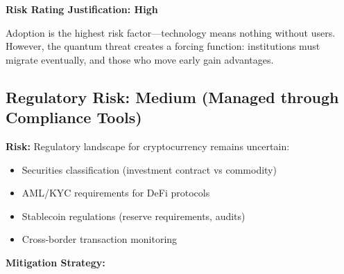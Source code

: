 \documentclass[11pt,a4paper]{article}
\begin{document}
\textbf{Risk Rating Justification: High}

Adoption is the highest risk factor—technology means nothing without users. However, the quantum threat creates a forcing function: institutions must migrate eventually, and those who move early gain advantages.

\subsection{Regulatory Risk: Medium (Managed through Compliance Tools)}

\textbf{Risk:} Regulatory landscape for cryptocurrency remains uncertain:
\begin{itemize}[leftmargin=*]
\item Securities classification (investment contract vs commodity)
\item AML/KYC requirements for DeFi protocols
\item Stablecoin regulations (reserve requirements, audits)
\item Cross-border transaction monitoring
\end{itemize}

\textbf{Mitigation Strategy:}
\end{document}
